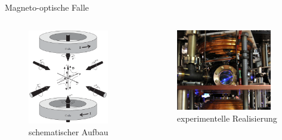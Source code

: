 \documentclass[12pt,xcolor=dvipsnames,professionalfonts]{beamer}
\begin{document}
\begin{frame}{Magneto-optische Falle}
\begin{columns}
	\begin{figure}
		\centering
		\includegraphics[width=0.9\textwidth]{./figures/mot_3d.png}
		\caption{schematischer Aufbau \cite{foot}}
	\end{figure}

	\begin{figure}
		\centering
		\includegraphics[width=0.9\textwidth]{./figures/mot_columbia.jpg}
		\caption{experimentelle Realisierung \cite{columbia}}
	\end{figure}
\end{columns}
\end{frame}
\end{document}
